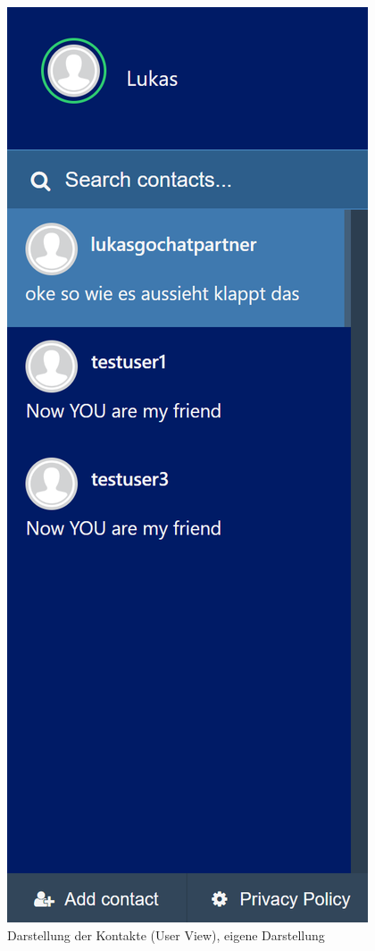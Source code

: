 \documentclass[a4paper,titlepage,halfparskip,12pt]{scrreprt}
\begin{document}
\begin{onehalfspacing}
\begin{figure}[h]
\begin{minipage}[c]{.43\textwidth}
		\includegraphics[scale=0.35]{images/KontaktlisteUserview}
		\caption{Darstellung der Kontakte (User View), eigene Darstellung}
		\label{img:KontaktlisteUserview}
	\end{minipage}

\end{figure}
\end{onehalfspacing}
\end{document}
